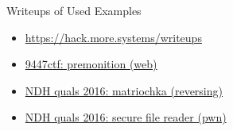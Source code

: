 \begin{frame}
  {Writeups of Used Examples}

  \begin{itemize}
    \item \url{https://hack.more.systems/writeups}
  \end{itemize}

  \begin{itemize}
    \item
      \href{http://losfuzzys.github.io/writeup/2015/12/07/9447ctf-premonition/}
      {9447ctf: premonition (web)}
    \item \href{https://losfuzzys.github.io/writeup/2016/04/04/ndhquals2016-matriochka/}
      {NDH quals 2016: matriochka (reversing)}
    \item \href{https://losfuzzys.github.io/writeup/2016/04/04/ndhquals2016-secure-file-reader/}
      {NDH quals 2016: secure file reader (pwn)}
  \end{itemize}

\end{frame}
